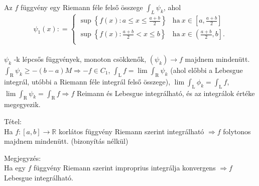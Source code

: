 \documentclass[12pt,a4paper]{scrartcl}
\newenvironment{tetel}{}{}
\newenvironment{bizonyitas}{}{}
\newenvironment{megjegyzes}{}{}
\begin{document}
\begin{bizonyitas}
Az \(f\) függvény egy Riemann féle felső összege \(\int_{L}\psi_{k}\),
ahol \[\psi_{1}\left( x \right): = \left\{ \begin{matrix}
{\sup\left\{ {f\left( x \right):a \leq x \leq \frac{a + b}{2}} \right\}} & {\text{ha}~x \in \left\lbrack {a,\frac{a + b}{2}} \right\rbrack} \\
{\sup\left\{ {f\left( x \right):\frac{a + b}{2} < x \leq b} \right\}} & {\text{ha}~x \in {\left( {\frac{a + b}{2},b} \right\rbrack.}} \\
\end{matrix} \right.\]\\
\(\psi_{k}\) -k lépcsős függvények, monoton csökkenők,
\(\left. \left( \psi_{k} \right)\rightarrow f \right.\) majdnem
mindenütt.
\(\left. {\int_{\text{R}}\psi_{k}} \geq - \left( {b - a} \right)M\Rightarrow - f \in C_{1} \right.\),
\({\int_{\text{L}}f} = \lim{\int_{\text{R}}\psi_{k}}\) (ahol előbbi a
Lebesgue integrál, utóbbi a Riemann féle integrál felső összege),
\(\lim{\int_{\text{L}}\phi_{k}} = {\int_{\text{L}}f}\),
\(\left. \lim{\int_{\text{R}}\psi_{k}} = {\int_{\text{R}}f}\Rightarrow f \right.\)
Reimann és Lebesgue integrálható, és az integrálok értéke megegyezik.

\end{bizonyitas}

\begin{tetel}

Tétel:\\
Ha
\(\left. f:\left\lbrack {a,b} \right\rbrack\rightarrow{\mathbb{R}} \right.\)
korlátos függvény Riemann szerint integrálható
\(\left. \Rightarrow f \right.\) folytonos majdnem mindenütt.
(bizonyítás nélkül)

\end{tetel}

\begin{megjegyzes}

Megjegyzés:\\
Ha egy \(f\) függvény Riemann szerint improprius integrálja konvergens
\(\Rightarrow f\) Lebesgue integrálható.

\end{megjegyzes}
\end{document}

